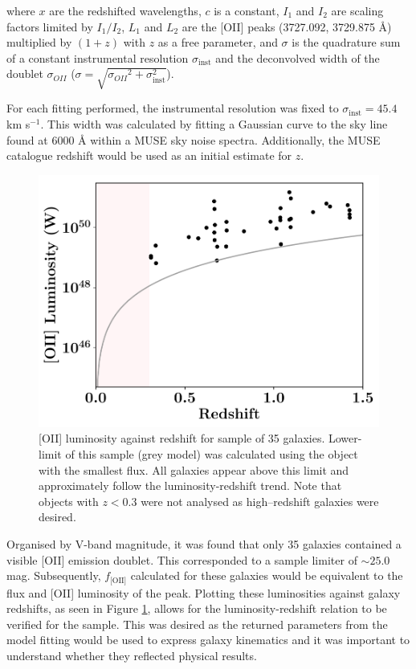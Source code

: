 \documentclass[12pt, twocolumn, nofootinbib]{revtex4-1}    %
\begin{document}
where $x$ are the redshifted wavelengths, ${c}$ is a constant, ${I_1}$ and ${I_2}$ are scaling factors limited by $I_1/I_2$, $L_1$ and $L_2$ are the [OII] peaks (3727.092, 3729.875 {\AA}) multiplied by $(1+{z})$ with $z$ as a free parameter, and $\sigma$ is the quadrature sum of a constant instrumental resolution $\sigma_{\text{inst}}$ and the deconvolved width of the doublet $\sigma_{OII}$ ($\sigma=\sqrt{{\sigma_{OII}}^2 + \sigma_{\text{inst}}^2}$).

For each fitting performed, the instrumental resolution was fixed to $\sigma_{\text{inst}}=45.4$ km s$^{-1}$. This width was calculated by fitting a Gaussian curve to the sky line found at 6000 {\AA} within a MUSE sky noise spectra. Additionally, the MUSE catalogue redshift would be used as an initial estimate for $z$.

\begin{figure}
\includegraphics[width=1.0\linewidth]{data/o_ii_luminosity_vs_redshift}
\caption{[OII] luminosity against redshift for sample of 35 galaxies. Lower-limit of this sample (grey model) was calculated using the object with the smallest flux. All galaxies appear above this limit and approximately follow the luminosity-redshift trend. Note that objects with $z<0.3$ were not analysed as high--redshift galaxies were desired.}
\label{fig:oiiluminosity_redshift}
\end{figure} 

Organised by V-band magnitude, it was found that only 35 galaxies contained a visible [OII] emission doublet. This corresponded to a sample limiter of $\sim25.0$ mag. Subsequently, $f_{\text{[OII]}}$ calculated for these galaxies would be equivalent to the flux and [OII] luminosity of the peak. Plotting these luminosities against galaxy redshifts, as seen in Figure \ref{fig:oiiluminosity_redshift}, allows for the luminosity-redshift relation to be verified for the sample. This was desired as the returned parameters from the model fitting would be used to express galaxy kinematics and it was important to understand whether they reflected physical results. 
\end{document}
